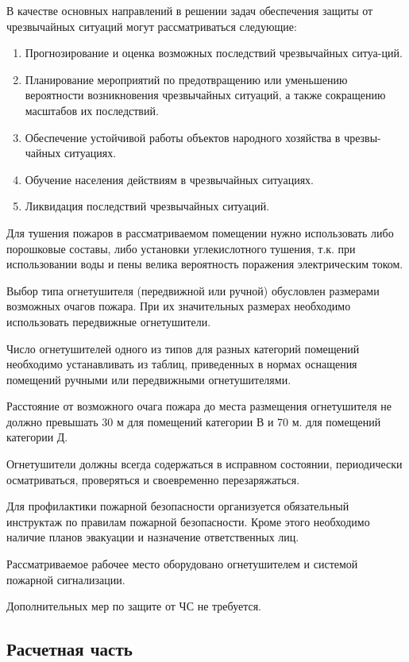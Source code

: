 В качестве основных направлений в решении задач обеспечения защиты от чрезвычайных ситуаций могут рассматриваться следующие:

\begin{enumerate}[1.]
	\item Прогнозирование и оценка возможных последствий чрезвычайных ситуа-ций.
	\item Планирование мероприятий по предотвращению или уменьшению вероятности возникновения чрезвычайных ситуаций, а также сокращению масштабов их последствий.
	\item Обеспечение устойчивой работы объектов народного хозяйства в чрезвы-чайных ситуациях.
	\item Обучение населения действиям в чрезвычайных ситуациях.
	\item Ликвидация последствий чрезвычайных ситуаций.
\end{enumerate}

Для тушения пожаров в рассматриваемом помещении нужно использовать либо порошковые составы, либо установки углекислотного тушения, т.к. при использовании воды и пены велика вероятность поражения электрическим током.

Выбор типа огнетушителя (передвижной или ручной) обусловлен размерами возможных очагов пожара. При их значительных размерах необходимо использовать передвижные огнетушители.

Число огнетушителей одного из типов для разных категорий помещений необходимо устанавливать из таблиц, приведенных в нормах оснащения помещений ручными или передвижными огнетушителями.

Расстояние от возможного очага пожара до места размещения огнетушителя не должно превышать 30 м для помещений категории В и 70 м. для помещений категории Д.

Огнетушители должны всегда содержаться в исправном состоянии, периодически осматриваться, проверяться и своевременно перезаряжаться.

Для профилактики пожарной безопасности организуется обязательный инструктаж по правилам пожарной безопасности. Кроме этого необходимо наличие планов эвакуации и назначение ответственных лиц.

Рассматриваемое рабочее место оборудовано огнетушителем и системой пожарной сигнализации.

Дополнительных мер по защите от ЧС не требуется.

\subsection{Расчетная часть}

